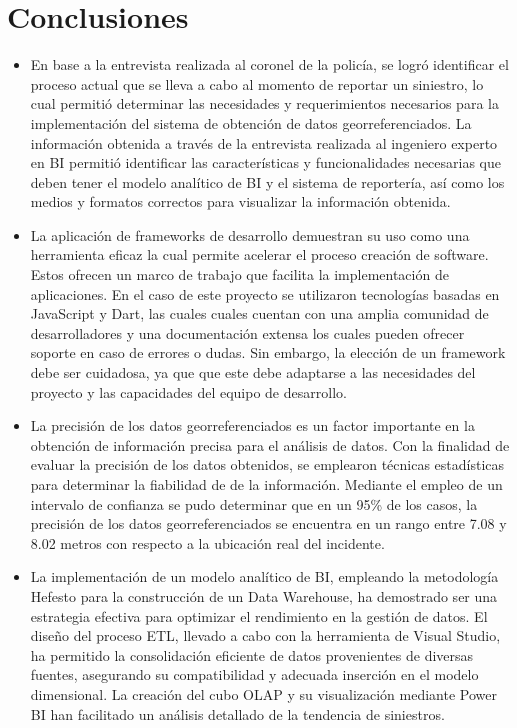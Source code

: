 \section{Conclusiones}
\begin{itemize}
      \item En base a la entrevista realizada al coronel de la policía, se logró identificar el proceso actual que se lleva
            a cabo al momento de reportar un siniestro, lo cual permitió determinar las necesidades y requerimientos necesarios
            para la implementación del sistema de obtención de datos georreferenciados. La información obtenida a través de la
            entrevista realizada al ingeniero experto en BI permitió identificar las características y funcionalidades necesarias
            que deben tener el modelo analítico de BI y el sistema de reportería, así como los medios y formatos correctos para
            visualizar la información obtenida.

      \item La aplicación de frameworks de desarrollo demuestran su uso como una herramienta eficaz la cual permite
            acelerar el proceso creación de software. Estos ofrecen un marco de trabajo que facilita la implementación de
            aplicaciones. En el caso de este proyecto se utilizaron tecnologías basadas en JavaScript y Dart, las cuales
            cuales cuentan con una amplia comunidad de desarrolladores y una documentación extensa los cuales pueden
            ofrecer soporte en caso de errores o dudas. Sin embargo, la elección de un framework debe ser cuidadosa, ya que
            que este debe adaptarse a las necesidades del proyecto y las capacidades del equipo de desarrollo.

      \item La precisión de los datos georreferenciados es un factor importante en la obtención de información precisa
            para el análisis de datos. Con la finalidad de evaluar la precisión de los datos obtenidos, se emplearon técnicas
            estadísticas para determinar la fiabilidad de de la información. Mediante el empleo de un intervalo de confianza
            se pudo determinar que en un 95\% de los casos, la precisión de los datos georreferenciados se encuentra en un
            rango entre 7.08 y 8.02 metros con respecto a la ubicación real del incidente.

      \item La implementación de un modelo analítico de BI, empleando la metodología Hefesto para la construcción de un Data
            Warehouse, ha demostrado ser una estrategia efectiva para optimizar el rendimiento en la gestión de datos. El
            diseño del proceso ETL, llevado a cabo con la herramienta de Visual Studio, ha permitido la consolidación
            eficiente de datos provenientes de diversas fuentes, asegurando su compatibilidad y adecuada inserción en el
            modelo dimensional. La creación del cubo OLAP y su visualización mediante Power BI han facilitado un análisis
            detallado de la tendencia de siniestros.


\end{itemize}
